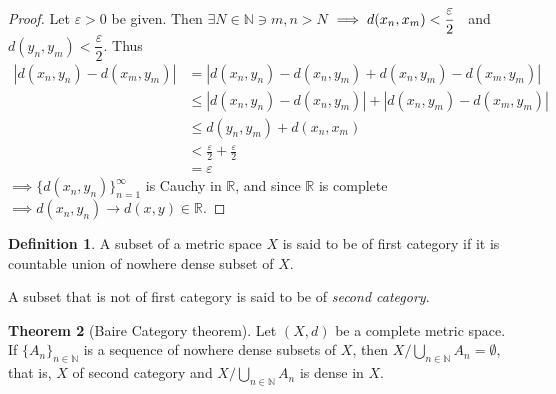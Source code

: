 \documentclass[11pt,a4paper]{article}
\theoremstyle{definition}
\newtheorem{thm}{Theorem}[section]
\newtheorem{defn}[thm]{Definition}
\begin{document}
\begin{proof}
Let $\varepsilon>0$ be given. Then $\exists N\in \mathbb{N}\ni m,n>N$ \hspace{0.2cm}$\implies d(x_n,x_m)<\dfrac{\varepsilon}{2}\hspace{0.2cm}$ and \hspace{0.2cm}$d(y_n,y_m)<\dfrac{\varepsilon}{2}.$ Thus 
\begin{align*}
|d(x_n,y_n)-d(x_m,y_m)| &=|d(x_n,y_n)-d(x_n,y_m)+d(x_n,y_m)-d(x_m,y_m)|\\
                        &\leq |d(x_n,y_n)-d(x_n,y_m)|+|d(x_n,y_m)-d(x_m,y_m)|\\
                        &\leq d(y_n,y_m)+d(x_n,x_m)\\
                        &<\frac{\varepsilon}{2}+\frac{\varepsilon}{2}\\
                        &=\varepsilon
\end{align*}
$\implies \{d(x_n,y_n)\}^{\infty}_{n=1}$ is Cauchy in $\mathbb{R}$, and since $\mathbb{R}$ is complete $\implies d(x_n,y_n)\rightarrow d(x,y)\in \mathbb{R}$.

\end{proof}

\begin{defn}
A subset of a metric space $X$ is said to be of first category if it is countable union of nowhere dense subset of $X$.

A subset that is not of first category is said to be of \emph{second category}.

\end{defn}


\begin{thm}[Baire Category theorem]
Let $(X,d)$ be a complete metric space. If $\{A_n\}_{n\in \mathbb{N}}$ is a sequence of nowhere dense subsets of $X$, then $X/\bigcup_{n\in \mathbb{N}}A_n=\emptyset$, that is, $X$ of second category and $X/\bigcup_{n\in \mathbb{N}}A_n$ is dense in $X$.

\end{thm}
\end{document}
